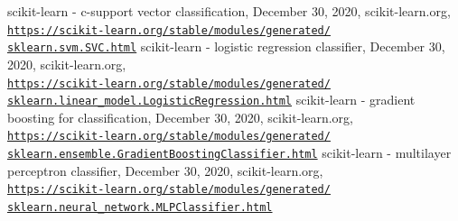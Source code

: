 \documentclass[a4paper,12pt,nottoc]{article}
\begin{document}
\begin{thebibliography}{9}
 scikit-learn - c-support vector classification, December 30, 2020, scikit-learn.org, \\\href{https://scikit-learn.org/stable/modules/generated/sklearn.svm.SVC.html}{\texttt{https://scikit-learn.org/stable/modules/generated/\\sklearn.svm.SVC.html}}
 scikit-learn - logistic regression classifier, December 30, 2020, scikit-learn.org, \\\href{https://scikit-learn.org/stable/modules/generated/sklearn.linear_model.LogisticRegression.html}{\texttt{https://scikit-learn.org/stable/modules/generated/\\sklearn.linear\_model.LogisticRegression.html}}
 scikit-learn - gradient boosting for classification, December 30, 2020, scikit-learn.org, \\\href{https://scikit-learn.org/stable/modules/generated/sklearn.ensemble.GradientBoostingClassifier.html}{\texttt{https://scikit-learn.org/stable/modules/generated/\\sklearn.ensemble.GradientBoostingClassifier.html}}
 scikit-learn - multilayer perceptron classifier, December 30, 2020, scikit-learn.org, \\\href{https://scikit-learn.org/stable/modules/generated/sklearn.neural_network.MLPClassifier.html}{\texttt{https://scikit-learn.org/stable/modules/generated/\\sklearn.neural\_network.MLPClassifier.html}}
\end{thebibliography}
\end{document}

